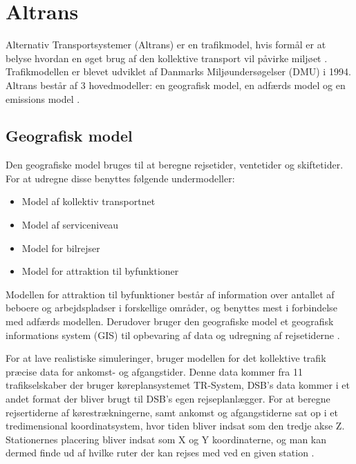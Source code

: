 \section{Altrans}
Alternativ Transportsystemer (Altrans) er en trafikmodel, hvis formål er at belyse hvordan en øget brug af den kollektive transport vil påvirke miljøet \cite[s. 14]{dmumodelanalyser}. Trafikmodellen er blevet udviklet af Danmarks Miljøundersøgelser (DMU) i 1994. Altrans består af 3 hovedmodeller: en geografisk model, en adfærds model og en emissions model \cite[s. 14]{dmuadfaerdsmodel}.
\subsection{Geografisk model}
Den geografiske model bruges til at beregne rejsetider, ventetider og skiftetider. For at udregne disse benyttes følgende undermodeller:

\begin{itemize}
\item Model af kollektiv transportnet
\item Model af serviceniveau
\item Model for bilrejser
\item Model for attraktion til byfunktioner
\end{itemize}

Modellen for attraktion til byfunktioner består af information over antallet af beboere og arbejdspladser i forskellige områder, og benyttes mest i forbindelse med adfærds modellen. Derudover bruger den geografiske model et geografisk informations system (GIS) til opbevaring af data og udregning af rejsetiderne \cite[s. 18-19]{dmumodelanalyser}.

\vspace{5mm}

For at lave realistiske simuleringer, bruger modellen for det kollektive trafik præcise data for ankomst- og afgangstider. Denne data kommer fra 11 trafikselskaber der bruger køreplansystemet TR-System, DSB’s data kommer i et andet format der bliver brugt til DSB’s egen rejseplanlægger. For at beregne rejsertiderne af kørestrækningerne, samt ankomst og afgangstiderne sat op i et tredimensional koordinatsystem, hvor tiden bliver indsat som den tredje akse Z. Stationernes placering bliver indsat som X og Y koordinaterne, og man kan dermed finde ud af hvilke ruter der kan rejses med ved en given station \cite[s. 20-22]{dmumodelanalyser}.

\vspace{5mm}

